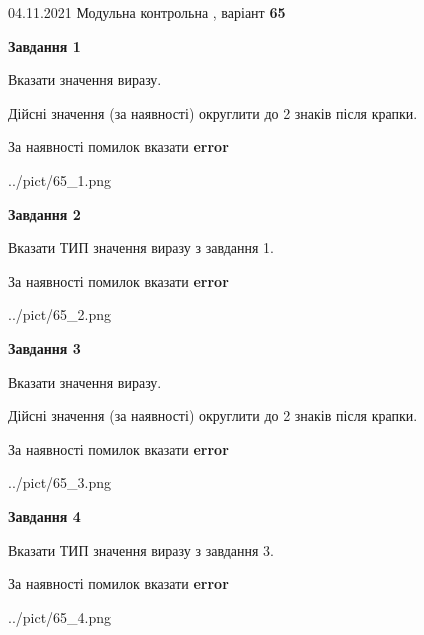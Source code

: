 \documentclass[11pt, ukrainian]{article}
\begin{document}
{04.11.2021 Модульна контрольна , варіант  \No \textbf { 65 }\par}
{
\begin {large}
{\begin {center}\textbf{Завдання 1}\end {center}}\par
Вказати значення виразу. \par
Дійсні значення (за наявності) округлити до 2 знаків після крапки. \par
За наявності помилок вказати \textbf{error}

\begin{center}
	{../pict/65_1.png}
\end{center}
\newpage

{\begin {center}\textbf{Завдання 2}\end {center}}\par
Вказати ТИП значення виразу з завдання 1. \par
За наявності помилок вказати \textbf{error}

\begin{center}
	{../pict/65_2.png}
\end{center}
\newpage

{\begin {center}\textbf{Завдання 3}\end {center}}\par
Вказати значення виразу. \par
Дійсні значення (за наявності) округлити до 2 знаків після крапки. \par
За наявності помилок вказати \textbf{error}

\begin{center}
	{../pict/65_3.png}
\end{center}
\newpage

{\begin {center}\textbf{Завдання 4}\end {center}}\par
Вказати ТИП значення виразу з завдання 3. \par
За наявності помилок вказати \textbf{error}

\begin{center}
	{../pict/65_4.png}
\end{center}
\newpage


\end{large}}
\end{document}
